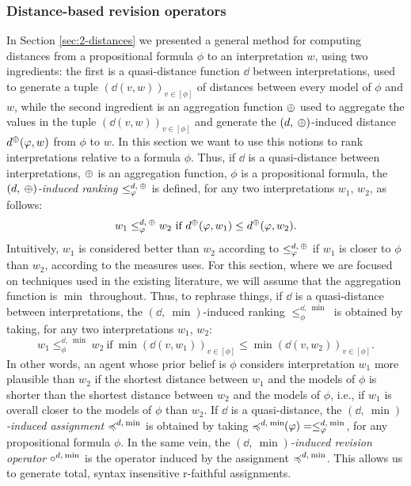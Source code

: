 \subsubsection{Distance-based revision operators}
In Section \ref{sec:2-distances} we presented a 
general method for computing distances from a propositional
formula $\phi$ to an interpretation $w$,
using two ingredients:
the first is a quasi-distance function $\dd$ between interpretations,
used to generate a tuple $(\dd(v,w))_{v\in[\phi]}$ of distances 
between every model of $\phi$ and $w$,
while the second ingredient is an aggregation function ${\operatorname{\oplus}}$ used to
aggregate the values in the tuple $(\dd(v,w))_{v\in[\phi]}$
and generate the $(d,\:{\operatorname{\oplus}})$-induced distance 
$d^{{\operatorname{\oplus}}}(\varphi,w)$ from $\phi$ to $w$. 
In this section we want to use this notions to 
rank interpretations relative to a formula $\phi$.
Thus, if $\dd$ is a quasi-distance between interpretations,
${\operatorname{\oplus}}$ is an aggregation function,
$\phi$ is a propositional formula,
the \emph{$(d,\:{\operatorname{\oplus}})$-induced ranking $\le^{d,\:{\operatorname{\oplus}}}_{\varphi}$}
is defined,
for any two interpretations $w_1$, $w_2$,
as follows:
$$
	w_1 \le^{d,\:{\operatorname{\oplus}}}_{\varphi}w_2~\text{if}~d^{{\operatorname{\oplus}}}(\varphi,w_1)\le d^{{\operatorname{\oplus}}}(\varphi,w_2).
$$
Intuitively, $w_1$ is considered better than $w_2$ according to $\le^{d,\:{\operatorname{\oplus}}}_{\varphi}$
if $w_1$ is closer to $\phi$ than $w_2$, according to the measures uses.
For this section, where we are focused on techniques used in the existing literature,
we will assume that the aggregation function is $\min$ throughout.
Thus, to rephrase things,
if $\dd$ is a quasi-distance between interpretations,
the $(\dd,\:\min)$-induced ranking $\le^{\dd,\:\min}_{\phi}$ is obtained 
by taking, for any two interpretations $w_1$, $w_2$:
\begin{displaymath}
	w_1\le^{\dd,\:\min}_{\phi} w_2~\text{if}~\min(\dd(v,w_1))_{v\in[\phi]}\le\min(\dd(v,w_2))_{v\in[\phi]}.
\end{displaymath}
In other words, an agent whose prior belief is $\phi$ considers 
interpretation $w_1$ more plausible than $w_2$ 
if the shortest distance between $w_1$ and the models of $\phi$ 
is shorter than the shortest distance between $w_2$ and the models of $\phi$,
i.e., if $w_1$ is overall closer to the models of $\phi$ than $w_2$.
If $\dd$ is a quasi-distance,
the \emph{${(\dd,\:\min)}$-induced assignment $\preccurlyeq^{d,\:{\operatorname{min}}}$} is obtained by taking 
$\preccurlyeq^{d,\:{\operatorname{min}}}\!\!(\varphi)=\le_\varphi^{d,\:{\operatorname{min}}}$,
for any propositional formula $\phi$.
In the same vein, the \emph{${(\dd,\:\min)}$-induced revision operator $\circ^{d,\:{\operatorname{min}}}$} 
is the operator induced by the assignment $\preccurlyeq^{d,\:{\operatorname{min}}}$.
This allows us to generate total, syntax insensitive r-faithful assignments.


